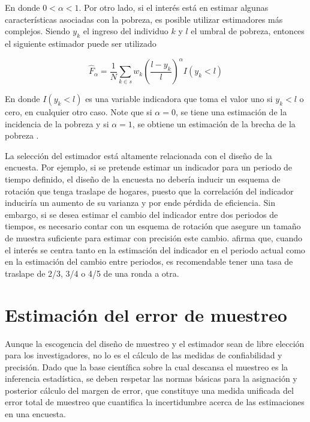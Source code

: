 En donde \(0 < \alpha < 1\). Por otro lado, si el interés está en estimar algunas características asociadas con la pobreza, es posible utilizar estimadores más complejos. Siendo \(y_k\) el ingreso del individuo \(k\) y \(l\) el umbral de pobreza, entonces el siguiente estimador puede ser utilizado

\[
\hat{F}_{\alpha}=\frac{1}{N}\sum_{k\in s} w_k 
\left(\frac{l-y_k}{l}\right)^{\alpha}I(y_k<l)
\]

En donde \(I(y_k<l)\) es una variable indicadora que toma el valor uno si \(y_k<l\) o cero, en cualquier otro caso. Note que si \(\alpha = 0\), se tiene una estimación de la incidencia de la pobreza y si \(\alpha = 1\), se obtiene un estimación de la brecha de la pobreza \citep{Foster_Greer_Thorbecke_1984}.

La selección del estimador está altamente relacionada con el diseño de la encuesta. Por ejemplo, si se pretende estimar un indicador para un periodo de tiempo definido, el diseño de la encuesta no debería inducir un esquema de rotación que tenga traslape de hogares, puesto que la correlación del indicador induciría un aumento de su varianza y por ende pérdida de eficiencia. Sin embargo, si se desea estimar el cambio del indicador entre dos periodos de tiempos, es necesario contar con un esquema de rotación que asegure un tamaño de muestra suficiente para estimar con precisión este cambio. \citet[sección 12.13]{Cochran_1977} afirma que, cuando el interés se centra tanto en la estimación del indicador en el periodo actual como en la estimación del cambio entre periodos, es recomendable tener una tasa de traslape de 2/3, 3/4 o 4/5 de una ronda a otra.

\hypertarget{estimacion-del-error-de-muestreo}{%
\section{Estimación del error de muestreo}\label{estimacion-del-error-de-muestreo}}

Aunque la escogencia del diseño de muestreo y el estimador sean de libre elección para los investigadores, no lo es el cálculo de las medidas de confiabilidad y precisión. Dado que la base científica sobre la cual descansa el muestreo es la inferencia estadística, se deben respetar las normas básicas para la asignación y posterior cálculo del margen de error, que constituye una medida unificada del error total de muestreo que cuantifica la incertidumbre acerca de las estimaciones en una encuesta.

